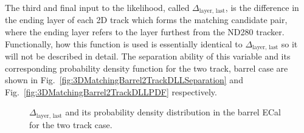 \newline
\newline
The third and final input to the likelihood, called $\Delta_{\textrm{layer, last}}$, is the difference in the ending layer of each 2D track which forms the matching candidate pair, where the ending layer refers to the layer furthest from the ND280 tracker.  Functionally, how this function is used is essentially identical to $\Delta_{\textrm{layer, last}}$ so it will not be described in detail.  The separation ability of this variable and its corresponding probability density function for the two track, barrel case are shown in Fig.~\ref{fig:3DMatchingBarrel2TrackDLLSeparation} and Fig.~\ref{fig:3DMatchingBarrel2TrackDLLPDF} respectively.
\begin{figure}%
  \centering
  \caption{$\Delta_{\textrm{layer, last}}$ and its probability density distribution in the barrel ECal for the two track case.}
  \label{fig:DLL}
\end{figure}
